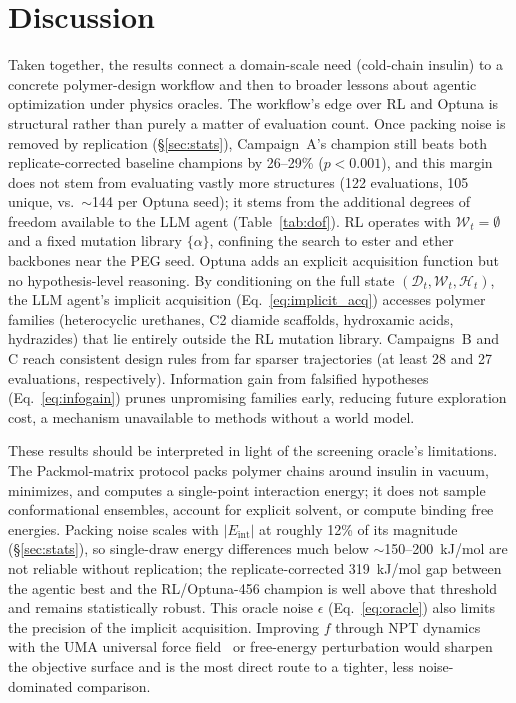 \documentclass[twocolumn]{fairmeta}
\begin{document}
\section{Discussion}

Taken together, the results connect a domain-scale need (cold-chain insulin) to a concrete polymer-design workflow and then to broader lessons about agentic optimization under physics oracles.
The workflow's edge over RL and Optuna is structural rather than purely a matter of evaluation count.
Once packing noise is removed by replication (\S\ref{sec:stats}), Campaign~A's champion still beats both replicate-corrected baseline champions by 26--29\% ($p<0.001$), and this margin does not stem from evaluating vastly more structures (122 evaluations, 105 unique, vs.\ ${\sim}$144 per Optuna seed); it stems from the additional degrees of freedom available to the LLM agent (Table~\ref{tab:dof}).
RL operates with $\mathcal{W}_t = \emptyset$ and a fixed mutation library $\{\alpha\}$, confining the search to ester and ether backbones near the PEG seed.
Optuna adds an explicit acquisition function but no hypothesis-level reasoning.
By conditioning on the full state $(\mathcal{D}_t, \mathcal{W}_t, \mathcal{H}_t)$, the LLM agent's implicit acquisition (Eq.~\ref{eq:implicit_acq}) accesses polymer families (heterocyclic urethanes, C2 diamide scaffolds, hydroxamic acids, hydrazides) that lie entirely outside the RL mutation library.
Campaigns~B and C reach consistent design rules from far sparser trajectories (at least 28 and 27 evaluations, respectively).
Information gain from falsified hypotheses (Eq.~\ref{eq:infogain}) prunes unpromising families early, reducing future exploration cost, a mechanism unavailable to methods without a world model.

These results should be interpreted in light of the screening oracle's limitations.
The Packmol-matrix protocol packs polymer chains around insulin in vacuum, minimizes, and computes a single-point interaction energy; it does not sample conformational ensembles, account for explicit solvent, or compute binding free energies.
Packing noise scales with $|E_\text{int}|$ at roughly 12\% of its magnitude (\S\ref{sec:stats}), so single-draw energy differences much below ${\sim}$150--200~kJ/mol are not reliable without replication; the replicate-corrected 319~kJ/mol gap between the agentic best and the RL/Optuna-456 champion is well above that threshold and remains statistically robust.
This oracle noise $\epsilon$ (Eq.~\ref{eq:oracle}) also limits the precision of the implicit acquisition.
Improving $f$ through NPT dynamics with the UMA universal force field~\cite{wood2025uma} or free-energy perturbation would sharpen the objective surface and is the most direct route to a tighter, less noise-dominated comparison.
\end{document}
